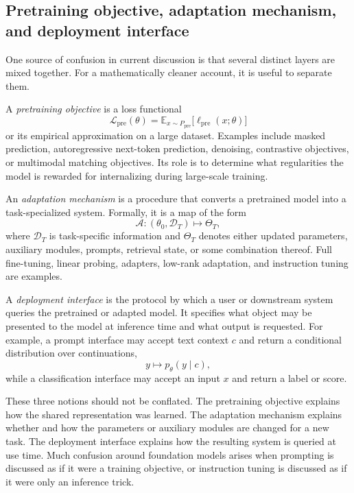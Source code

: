 \subsection*{Pretraining objective, adaptation mechanism, and deployment interface}

One source of confusion in current discussion is that several distinct layers are mixed together.
For a mathematically cleaner account, it is useful to separate them.

\begin{definition}
A \emph{pretraining objective} is a loss functional
\[
\mathcal{L}_{\mathrm{pre}}(\theta)
=
\mathbb{E}_{x \sim P_{\mathrm{pre}}}\bigl[\ell_{\mathrm{pre}}(x;\theta)\bigr]
\]
or its empirical approximation on a large dataset.
Examples include masked prediction, autoregressive next-token prediction, denoising, contrastive objectives, or multimodal matching objectives.
Its role is to determine what regularities the model is rewarded for internalizing during large-scale training.
\end{definition}

\begin{definition}
An \emph{adaptation mechanism} is a procedure that converts a pretrained model into a task-specialized system.
Formally, it is a map of the form
\[
\mathcal{A} : (\theta_0,\mathcal{D}_T) \mapsto \Theta_T,
\]
where $\mathcal{D}_T$ is task-specific information and $\Theta_T$ denotes either updated parameters, auxiliary modules, prompts, retrieval state, or some combination thereof.
Full fine-tuning, linear probing, adapters, low-rank adaptation, and instruction tuning are examples.
\end{definition}

\begin{definition}
A \emph{deployment interface} is the protocol by which a user or downstream system queries the pretrained or adapted model.
It specifies what object may be presented to the model at inference time and what output is requested.
For example, a prompt interface may accept text context $c$ and return a conditional distribution over continuations,
\[
y \mapsto p_{\theta}(y \mid c),
\]
while a classification interface may accept an input $x$ and return a label or score.
\end{definition}

These three notions should not be conflated.
The pretraining objective explains how the shared representation was learned.
The adaptation mechanism explains whether and how the parameters or auxiliary modules are changed for a new task.
The deployment interface explains how the resulting system is queried at use time.
Much confusion around foundation models arises when prompting is discussed as if it were a training objective, or instruction tuning is discussed as if it were only an inference trick.

